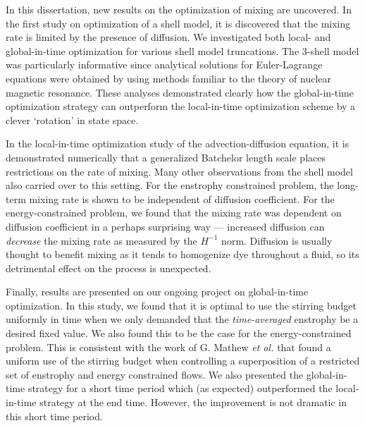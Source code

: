 


In this dissertation, new results on the optimization of mixing are uncovered. In the first study on optimization of a shell model, it is discovered that the mixing rate is limited by the presence of diffusion. We investigated both local- and global-in-time optimization for various shell model truncations. The 3-shell model was particularly informative since analytical solutions for Euler-Lagrange equations were obtained by using methods familiar to the theory of nuclear magnetic resonance. These analyses demonstrated clearly how the global-in-time optimization strategy  can outperform the local-in-time optimization scheme by a clever  `rotation' in state space.

In the local-in-time optimization study of the advection-diffusion equation, it is demonstrated numerically that a generalized Batchelor length scale places restrictions on the rate of mixing. Many other observations from the shell model also carried over to this setting.  For the enstrophy constrained problem, the long-term mixing rate is shown to be independent of diffusion coefficient. For the energy-constrained problem, we found that the mixing rate was dependent on diffusion coefficient in a perhaps surprising way --- increased diffusion can {\it decrease} the mixing rate as measured by the $H^{-1}$ norm. Diffusion is usually thought to benefit mixing as it tends to homogenize dye throughout a fluid, so its detrimental effect on the process is unexpected.

Finally, results are presented on our ongoing project on global-in-time optimization. In this study, we found that it is optimal to use the stirring budget uniformly in time when we only demanded that the {\it time-averaged} enstrophy be a desired fixed value. We also found this to be the case for the energy-constrained problem. This is consistent with the work of G. Mathew {\it et al.} \cite{GM2005} that found a uniform use of the stirring budget when controlling a superposition of a restricted set of enstrophy and energy constrained flows. We also presented the global-in-time strategy for a short time period which (as expected) outperformed the local-in-time strategy at the end time. However, the improvement is not dramatic in this short time period.


